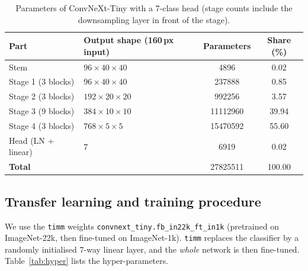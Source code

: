 \documentclass[11pt,a4paper]{article}
\newcommand{\code}[1]{\texttt{\small #1}}
\begin{document}
\begin{table}[H]
\centering\small
\caption{Parameters of ConvNeXt-Tiny with a 7-class head (stage counts include the downsampling layer in
front of the stage).}
\label{tab:params}
\begin{tabular}{l l S[table-format=8.0] S[table-format=3.2]}
\toprule
\textbf{Part} & \textbf{Output shape (160\,px input)} & {\textbf{Parameters}} & {\textbf{Share (\%)}} \\
\midrule
Stem                  & $96\times40\times40$   & 4896     & 0.02 \\
Stage 1 (3 blocks)    & $96\times40\times40$   & 237888   & 0.85 \\
Stage 2 (3 blocks)    & $192\times20\times20$  & 992256   & 3.57 \\
Stage 3 (9 blocks)    & $384\times10\times10$  & 11112960 & 39.94 \\
Stage 4 (3 blocks)    & $768\times5\times5$    & 15470592 & 55.60 \\
Head (LN + linear)    & $7$                    & 6919     & 0.02 \\
\midrule
\textbf{Total}        &                        & 27825511 & 100.00 \\
\bottomrule
\end{tabular}
\end{table}

\subsection{Transfer learning and training procedure}

We use the \code{timm} \cite{wightman2019timm} weights \code{convnext\_tiny.fb\_in22k\_ft\_in1k}
(pretrained on ImageNet-22k, then fine-tuned on ImageNet-1k). \code{timm} replaces the classifier by a
randomly initialised 7-way linear layer, and the \emph{whole} network is then fine-tuned.
Table~\ref{tab:hyper} lists the hyper-parameters.
\end{document}
